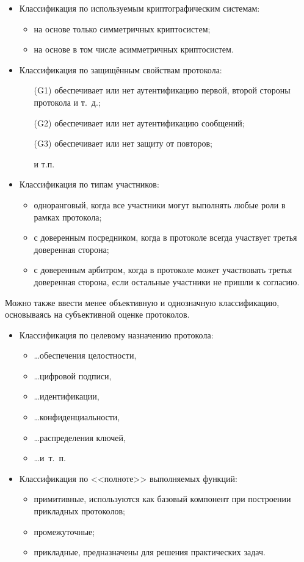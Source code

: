 \begin{itemize}
    \item Классификация по используемым криптографическим системам:
    \begin{itemize}
        \item на основе только симметричных криптосистем;
        \item на основе в том числе асимметричных криптосистем.
    \end{itemize}
    \item Классификация по защищённым свойствам протокола:
    \begin{itemize}
        \item[(G1)] обеспечивает или нет аутентификацию первой, второй стороны протокола и т.~д.;
        \item[(G2)] обеспечивает или нет аутентификацию сообщений;
        \item[(G3)] обеспечивает или нет защиту от повторов;
        \item[{}] и т.п.
    \end{itemize}
    \item Классификация по типам участников:
    \begin{itemize}
        \item одноранговый, когда все участники могут выполнять любые роли в рамках протокола;
        \item с доверенным посредником, когда в протоколе всегда участвует третья доверенная сторона;
        \item с доверенным арбитром, когда в протоколе может участвовать третья доверенная сторона, если остальные участники не пришли к согласию.
    \end{itemize}
\end{itemize}

Можно также ввести менее объективную и однозначную классификацию, основываясь на субъективной оценке протоколов.
\begin{itemize}
    \item Классификация по целевому назначению протокола:
    \begin{itemize}
        \item \dots обеспечения целостности, 
        \item \dots цифровой подписи, 
        \item \dots идентификации, 
        \item \dots конфиденциальности, 
        \item \dots распределения ключей, 
        \item \dots и~т.~п.
    \end{itemize}
    \item Классификация по <<полноте>> выполняемых функций:
    \begin{itemize}
        \item примитивные, используются как базовый компонент при построении прикладных протоколов;
        \item промежуточные;
        \item прикладные, предназначены для решения практических задач.
    \end{itemize}
\end{itemize}

